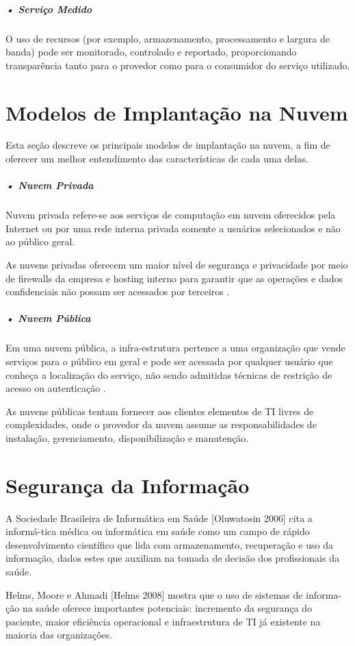 \documentclass[portuguese,oneside]{tcc}
\begin{document}
\subparagraph{• Serviço Medido}
O uso de recursos (por exemplo, armazenamento, processamento e largura de banda) pode ser monitorado, controlado e reportado, proporcionando transparência tanto para o provedor como para o consumidor do serviço utilizado.

\section{Modelos de Implantação na Nuvem}
Esta seção descreve os principais modelos de implantação na nuvem, a fim de oferecer um melhor entendimento das características de cada uma delas. 

\subparagraph{• Nuvem Privada}
Nuvem privada refere-se aos serviços de computação em nuvem oferecidos pela Internet ou por uma rede interna privada somente a usuários selecionados e não ao público geral.

As nuvens privadas oferecem um maior nível de segurança e privacidade por meio de firewalls da empresa e hosting interno para garantir que as operações e dados confidenciais não possam ser acessados por terceiros \cite{OQUEENUVEM}.

\subparagraph{• Nuvem Pública}
Em uma nuvem pública, a infra-estrutura pertence a uma  organização que vende serviços para o público em geral e pode  ser acessada por qualquer usuário que conheça a localização do  serviço, não sendo admitidas técnicas de restrição de acesso ou autenticação \cite{COMPUTACAOEMNUVEM}.

As nuvens públicas tentam fornecer aos clientes elementos de  TI livres de complexidades, onde o provedor da nuvem assume  as responsabilidades de instalação, gerenciamento, disponibilização e manutenção.  

\section{Segurança da Informação}
A Sociedade Brasileira de Informática em Saúde [Oluwatosin 2006] cita a informá-tica médica ou informática em saúde como um campo de rápido desenvolvimento científico que lida com armazenamento, recuperação e uso da informação, dados estes que auxiliam na tomada de decisão dos profissionais da saúde.

Helms, Moore e Ahmadi [Helms 2008] mostra que o uso de sistemas de informa-ção na saúde oferece importantes potenciais: incremento da segurança do paciente, maior eficiência operacional e infraestrutura de TI já existente na maioria das organizações.
\end{document}
